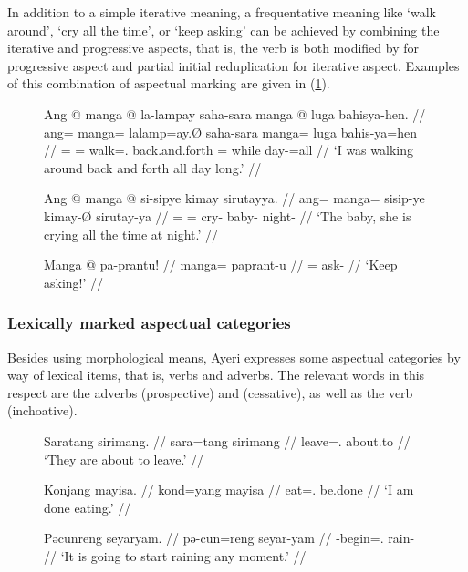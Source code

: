 In addition to a simple iterative meaning, a frequentative meaning like `walk 
around', `cry all the time', or `keep asking' can be achieved by combining the 
iterative and progressive aspects, that is, the verb is both modified by 
 for progressive aspect and partial initial reduplication for 
iterative aspect. Examples of this combination of aspectual marking are given
in (\ref{ex:progiter}).

\begin{figure}[h]
\pex\label{ex:progiter}
\a\begingl
	\gla Ang @ manga @ la-lampay saha-sara manga @ luga bahisya-hen. //
	\glb ang= manga= la\til{}lamp=ay.Ø saha-sara manga= luga bahis-ya=hen //
	\glc \AgtT{}= \Prog{}= \Iter{}\til{}walk=\Fsg{}.\Top{} back.and.forth 
		\Dir{}= while day-\Loc{}=all //
	\glft `I was walking around back and forth all day long.' //
\endgl

\a\begingl
	\gla Ang @ manga @ si-sipye kimay sirutayya. //
	\glb ang= manga= si\til{}sip-ye kimay-Ø sirutay-ya //
	\glc \AgtT{}= \Prog{}= \Iter{}\til{}cry-\TsgF{} baby-\Top{} 
		night-\Loc{} //
	\glft `The baby, she is crying all the time at night.' //
\endgl

\a\begingl
	\gla Manga @ pa-prantu! //
	\glb manga= pa\til{}prant-u //
	\glc \Prog{}= \Iter{}\til{}ask-\Imp{} //
	\glft `Keep asking!' //
\endgl
\xe
\end{figure}


\subsubsection{Lexically marked aspectual categories}

Besides using morphological means, Ayeri expresses some aspectual categories by
way of lexical items, that is, verbs and adverbs. The relevant words in this
respect are the adverbs  (prospective) and
 (cessative), as well as 
the verb  (inchoative).

\begin{figure}[h]
\pex
\a\label{ex:prospective}
\begingl
	\gla Saratang sirimang. //
	\glb sara=tang sirimang //
	\glc leave=\TplM{}.\Aarg{} about.to //
	\glft `They are about to leave.' //
\endgl

\a\label{ex:cessative}
\begingl
	\gla Konjang mayisa. //
	\glb kond=yang mayisa //
	\glc eat=\Fsg.\Aarg{} be.done //
	\glft `I am done eating.' //
\endgl

\a\label{ex:inchoative}
\begingl
	\gla Pəcunreng seyaryam. //
	\glb pə-cun=reng seyar-yam //
	\glc \NFut{}-begin=\TsgI{}.\Aarg{} rain-\Ptcp{} //
	\glft `It is going to start raining any moment.' //
\endgl
\xe
\end{figure}

